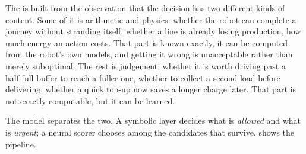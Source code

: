 The \NS is built from the observation that the decision has two different kinds of content. Some
of it is arithmetic and physics: whether the robot can complete a journey without stranding
itself, whether a line is already losing production, how much energy an action costs. That part is
known exactly, it can be computed from the robot's own models, and getting it wrong is
unacceptable rather than merely suboptimal. The rest is judgement: whether it is worth driving
past a half-full buffer to reach a fuller one, whether to collect a second load before delivering,
whether a quick top-up now saves a longer charge later. That part is not exactly computable, but
it can be learned.

The model separates the two. A symbolic layer decides what is \emph{allowed} and what is
\emph{urgent}; a neural scorer chooses among the candidates that survive. 
shows the pipeline.

